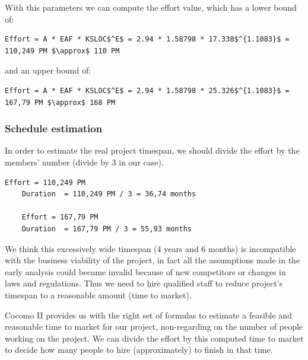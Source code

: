 \documentclass[english]{article}
\begin{document}
With this parameters we can compute the effort value, which has a lower bound of:
\begin{lstlisting}[mathescape, numbers=none, frame=single]
	Effort = A * EAF * KSLOC$^E$ = 2.94 * 1.58798 * 17.338$^{1.1083}$ = 110,249 PM $\approx$ 110 PM
\end{lstlisting}
and an upper bound of:
\begin{lstlisting}[mathescape, numbers=none, frame=single]
	Effort = A * EAF * KSLOC$^E$ = 2.94 * 1.58798 * 25.326$^{1.1083}$ = 167,79 PM $\approx$ 168 PM
\end{lstlisting}

\subsubsection{Schedule estimation}
In order to estimate the real project timespan, we should divide the effort by the members' number (divide by 3 in our case).
\begin{lstlisting}[mathescape, numbers=none]
	Effort = 110,249 PM 
	Duration  = 110,249 PM / 3 = 36,74 months 
	
	Effort = 167,79 PM
	Duration  = 167,79 PM / 3 = 55,93 months 
\end{lstlisting}
We think this excessively wide timespan (4 years and 6 months) is incompatible with the business viability of the project, in fact all the assumptions made in the early analysis could became invalid because of new competitors or changes in laws and regulations.
Thus we need to hire qualified staff to reduce project's timespan to a reasonable amount (time to market).
\par Cocomo II provides us with the right set of formulas to estimate a feasible and reasonable time to market for our project, non-regarding on the number of people working on the project. We can divide the effort by this computed time to market to decide how many people to hire (approximately) to finish in that time.
\end{document}
